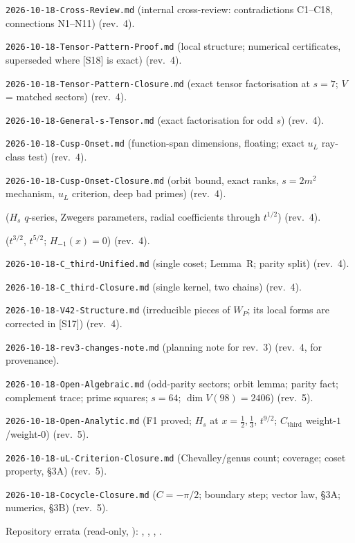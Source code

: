 \documentclass[11pt]{article}
\theoremstyle{definition}
\newcommand{\Cthird}{C_{\mathrm{third}}}
\begin{document}
\begin{enumerate}[label={[S\arabic*]},leftmargin=3em]
\item \texttt{2026-10-18-Cross-Review.md} (internal cross-review: contradictions C1--C18, connections N1--N11) (rev.~4).
\item \texttt{2026-10-18-Tensor-Pattern-Proof.md} (local structure; numerical certificates, superseded where [S18] is exact) (rev.~4).
\item \texttt{2026-10-18-Tensor-Pattern-Closure.md} (exact tensor factorisation at $s=7$; $V$ = matched sectors) (rev.~4).
\item \texttt{2026-10-18-General-s-Tensor.md} (exact factorisation for odd $s$) (rev.~4).
\item \texttt{2026-10-18-Cusp-Onset.md} (function-span dimensions, floating; exact $u_L$ ray-class test) (rev.~4).
\item \texttt{2026-10-18-Cusp-Onset-Closure.md} (orbit bound, exact ranks, $s=2m^2$ mechanism, $u_L$ criterion, deep bad primes) (rev.~4).
\item {} ($H_s$ $q$-series, Zwegers parameters, radial coefficients through $t^{1/2}$) (rev.~4).
\item {} ($t^{3/2}$, $t^{5/2}$; $H_{-1}(x)=0$) (rev.~4).
\item \texttt{2026-10-18-C\_third-Unified.md} (single coset; Lemma~R; parity split) (rev.~4).
\item \texttt{2026-10-18-C\_third-Closure.md} (single kernel, two chains) (rev.~4).
\item \texttt{2026-10-18-V42-Structure.md} (irreducible pieces of $W_P$; its local forms are corrected in [S17]) (rev.~4).
\item \texttt{2026-10-18-rev3-changes-note.md} (planning note for rev.~3) (rev.~4, for provenance).
\item \texttt{2026-10-18-Open-Algebraic.md} (odd-parity sectors; orbit lemma; parity fact; complement trace; prime squares; $s=64$; $\dim V(98)=2406$) (rev.~5).
\item \texttt{2026-10-18-Open-Analytic.md} (F1 proved; $H_s$ at $x=\tfrac12,\tfrac13$, $t^{9/2}$; $\Cthird$ weight-$1$/weight-$0$) (rev.~5).
\item \texttt{2026-10-18-uL-Criterion-Closure.md} (Chevalley/genus count; coverage; coset property, \S3A) (rev.~5).
\item \texttt{2026-10-18-Cocycle-Closure.md} ($C=-\pi/2$; boundary step; vector law, \S3A; numerics, \S3B) (rev.~5).
\end{enumerate}
Repository errata (read-only, ): ,
, ,
.
\end{document}
